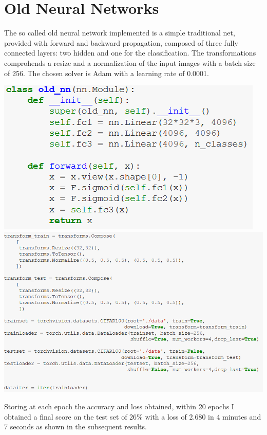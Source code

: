 \documentclass[11pt]{article}
\makeatletter
\def\maxwidth{\ifdim\Gin@nat@width>\linewidth\linewidth
  \else\Gin@nat@width\fi}
\let\Oldincludegraphics\includegraphics
\renewcommand{\includegraphics}[1]{\Oldincludegraphics[width=.8\maxwidth]{#1}}
\makeatother
\begin{document}
\section{Old Neural Networks}\label{oldnn}\hypertarget{oldnn}{}
The so called old neural network implemented is a simple traditional net, provided with forward and backward propagation, composed of three fully connected layers: two hidden and one for the classification.
The transformations comprohends a resize and a normalization of the input images with a batch size of 256.
The chosen solver is Adam with a learning rate of 0.0001. \newline
\begin{center}
  \includegraphics{1_class.png}
  \includegraphics{1_tran.png} \newline
\end{center}
Storing at each epoch the accuracy and loss obtained, within 20 epochs I obtained a final score on the test set of 26\% with a loss of 2.680 in 4 minutes and 7 seconds as shown in the subsequent results.
\end{document}
